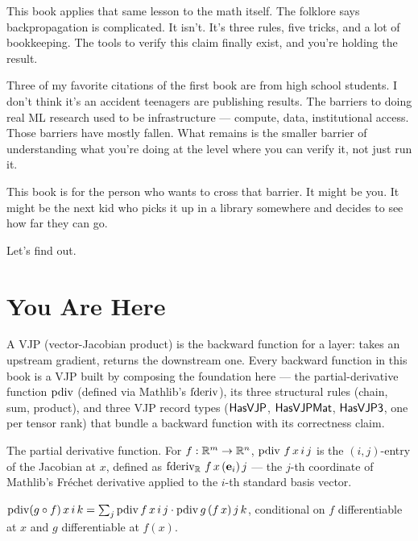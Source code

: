This book applies that same lesson to the math itself. The folklore
says backpropagation is complicated. It isn't. It's three rules, five
tricks, and a lot of bookkeeping. The tools to verify this claim
finally exist, and you're holding the result.

Three of my favorite citations of the first book are from high school
students. I don't think it's an accident teenagers are publishing
results. The barriers to doing real
ML research used to be infrastructure --- compute, data, institutional
access. Those barriers have mostly fallen. What remains is the
smaller barrier of understanding what you're doing at the level where
you can verify it, not just run it.

This book is for the person who wants to cross that barrier. It might
be you. It might be the next kid who picks it up in a library somewhere
and decides to see how far they can go.

Let's find out.

\chapter{You Are Here}
\label{chap:tensor}

A VJP (vector-Jacobian product) is the backward function for a layer:
takes an upstream gradient, returns the downstream one. Every backward
function in this book is a VJP built by composing the foundation
here --- the partial-derivative function \(\operatorname{pdiv}\) (defined via
Mathlib's \(\operatorname{fderiv}\)), its three structural rules (chain, sum,
product), and three VJP record types (\(\mathsf{HasVJP}\),
\(\mathsf{HasVJPMat}\), \(\mathsf{HasVJP3}\), one per tensor rank) that bundle a
backward function with its correctness claim.

\begin{definition}
  \label{ax:pdiv}
  \leanok
  The partial derivative function. For \(f : \mathbb{R}^{m} \to \mathbb{R}^{n}\),
  \(\operatorname{pdiv}\, f\, x\, i\, j\) is the \((i, j)\)-entry of the Jacobian at \(x\),
  defined as \(\operatorname{fderiv}_{\mathbb{R}}\, f\, x\, (\mathbf{e}_i)\, j\) — the
  \(j\)-th coordinate of Mathlib's Fréchet derivative applied to the
  \(i\)-th standard basis vector.
\end{definition}

\begin{theorem}
  \label{ax:pdiv_comp}
  \leanok
  \(\operatorname{pdiv}(g \circ f)\, x\, i\, k = \sum_j \operatorname{pdiv} f\, x\, i\, j \cdot \operatorname{pdiv} g\, (f\, x)\, j\, k\),
  conditional on \(f\) differentiable at \(x\) and \(g\) differentiable at \(f(x)\).
\end{theorem}

